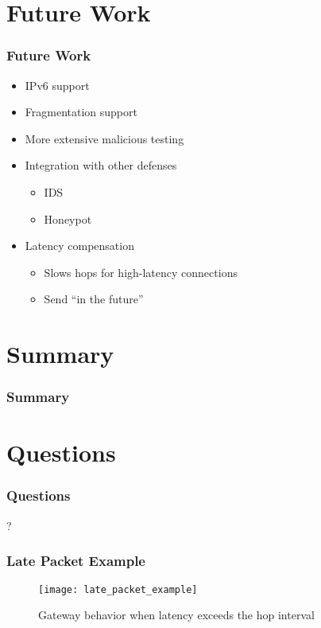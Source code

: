 \documentclass{beamer}
\begin{document}
\section{Future Work}
\begin{frame}
	\frametitle{Future Work}

	\begin{itemize}
	\item IPv6 support
	\item Fragmentation support
	\item More extensive malicious testing
	\item Integration with other defenses
		\begin{itemize}
		\item IDS
		\item Honeypot
		\end{itemize}
	\item Latency compensation
		\begin{itemize}
		\item Slows hops for high-latency connections
		\item Send ``in the future''
		\end{itemize}
	\end{itemize}
\end{frame}

\section{Summary}
\begin{frame}
	\frametitle{Summary}
	\tableofcontents
\end{frame}

\section{Questions}
\begin{frame}
	\frametitle{Questions}
	? 
\end{frame}


\begin{frame}
	\frametitle{Late Packet Example}

	\begin{figure}
	\caption{Gateway behavior when latency exceeds the hop interval}
	\vspace{-5pt}
	\texttt{[image: late\_packet\_example]}
	\end{figure}
\end{frame}
\end{document}
